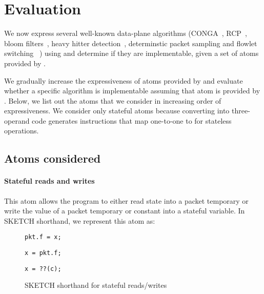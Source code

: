 \section{Evaluation}
\label{s:eval}

We now express several well-known data-plane algorithms (CONGA~\cite{conga},
RCP~\cite{rcp}, bloom filters~\cite{bloom}, heavy hitter
detection~\cite{opensketch}, determinstic packet sampling and flowlet switching
~\cite{flowlets}) using \pktlanguage and determine if they are implementable,
given a set of atoms provided by \absmachine.

We gradually increase the expressiveness of atoms provided by \pktlanguage and
evaluate whether a specific algorithm is implementable assuming that atom is
provided by \absmachine. Below, we list out the atoms that we consider in
increasing order of expressiveness. We consider only stateful atoms because
converting into three-operand code generates instructions that map one-to-one
to \absmachine for stateless operations.

\subsection{Atoms considered}
\paragraph{Stateful reads and writes}
This atom allows the program to either read state into a packet temporary or write the
value of a packet temporary or constant into a stateful variable. In SKETCH shorthand,
we represent this atom as:
\begin{figure}
\begin{lstlisting}[style=customc]
pkt.f = x;
\end{lstlisting}
\begin{lstlisting}[style=customc]
x = pkt.f;
\end{lstlisting}
\begin{lstlisting}[style=customc]
x = ??(c);
\end{lstlisting}
\caption{SKETCH shorthand for stateful reads/writes}
\label{fig:read/write}
\end{figure}

